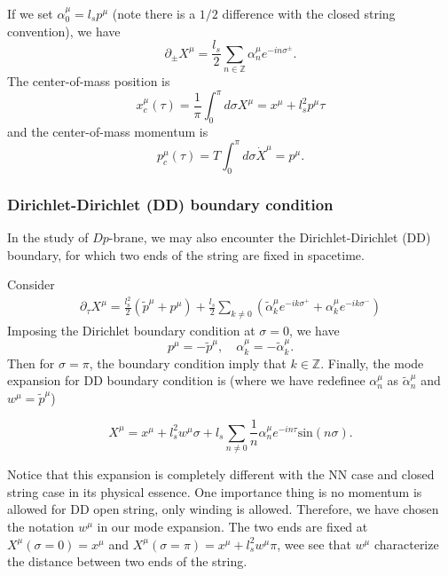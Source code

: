 \documentclass[graybox,envcountchap,sectrefs]{svmono}
\begin{document}
If we set $\alpha_0^{\mu}=l_sp^{\mu}$ (note there is a $1/2$ difference with the closed string convention), we have
\begin{equation}
\partial_{\pm}X^{\mu}=\frac{l_s}{2}\sum_{n\in\mathbb{Z}}\alpha^{\mu}_ne^{-in\sigma^{\pm}}.	
\end{equation}
The center-of-mass position is
\begin{equation}
x^{\mu}_{c}(\tau)=\frac{1}{\pi}\int_0^{\pi}d\sigma X^{\mu}=x^{\mu}+l_s^2p^{\mu}\tau	
\end{equation}
and the center-of-mass momentum is
\begin{equation}
p_c^{\mu}(\tau)=T\int_0^{\pi}d\sigma \dot{X}^{\mu}={p^{\mu}}.	
\end{equation}



\subsubsection*{Dirichlet-Dirichlet (DD) boundary condition}
In the study of $Dp$-brane, we may also encounter the Dirichlet-Dirichlet (DD) boundary, for which two ends of the string are fixed in spacetime.

Consider
\begin{align}
\partial_{\tau}X^{\mu}=	\frac{l_{\mathrm{s}}^2}{2}(\tilde{p}^{\mu}+p^{\mu})
+\frac{l_{s}}{2}\sum_{k\neq 0}(\tilde{\alpha}_k^{\mu}e^{-ik\sigma^+}+\alpha_k^{\mu}e^{-ik\sigma^-})
\end{align}
Imposing the Dirichlet boundary condition at $\sigma=0$, we have
\begin{equation}
p^{\mu}=-\tilde{p}^{\mu}	, \quad \alpha_k^{\mu}=-\tilde{\alpha}_k^{\mu}.
\end{equation}
Then for $\sigma=\pi$, the boundary condition imply that $k\in \mathbb{Z}$.
Finally, the mode expansion for DD boundary condition is (where we have redefinee $\alpha_n^{\mu}$ as $\tilde{\alpha}_n^{\mu}$ and $w^{\mu}=\tilde{p}^{\mu}$)
\begin{svgraybox}
\begin{equation}
X^{\mu}=x^{\mu}+l_s^2w^{\mu}\sigma+l_s\sum_{n\neq 0}\frac{1}{n}\alpha_n^{\mu}e^{-in\tau}\mathrm{sin} (n\sigma	).
\end{equation}
\end{svgraybox}
Notice that this expansion is completely different with the NN case and closed string case in its physical essence. One importance thing is
no momentum is allowed for DD open string, only winding is allowed. 
Therefore, we have chosen the notation $w^{\mu}$ in our mode expansion.
The two ends are fixed at $X^{\mu}(\sigma=0)=x^{\mu}$ and $X^{\mu}(\sigma=\pi)=x^{\mu}+l_s^2w^{\mu}\pi$, wee see that $w^{\mu}$ characterize the distance between two ends of the string.
\end{document}
